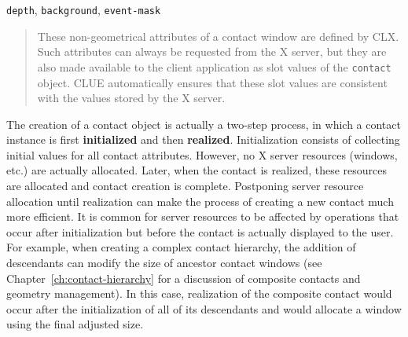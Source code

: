 \begin{flushright} \parbox[t]{6.125in}{
{\tt depth}, {\tt background}, {\tt event-mask}
\begin{quote}
These non-geometrical attributes of a contact window are defined by CLX. Such
attributes can always be requested from the X server, but they are also made
available to the client application as slot values of the {\tt contact}
object. CLUE automatically ensures that these slot values are consistent with
the values stored by the X server.
\end{quote}

}\end{flushright}



The creation of a contact object is actually a two-step process, in which a
contact instance is first {\bf initialized} and 
then {\bf realized}. Initialization consists
of collecting initial values for all contact attributes. However, no X server
 resources (windows, etc.) are actually
allocated.  Later, when the contact is realized,
these resources are allocated and contact creation is complete. Postponing
server resource allocation until realization can make the process of creating a
new contact much more efficient. It is common for server resources to be
affected by operations that occur after initialization but before the contact is
actually displayed to the user. For example, when creating a complex contact
hierarchy, the addition of descendants can modify the size of ancestor contact
windows (see Chapter~\ref{ch:contact-hierarchy} for a discussion of composite
contacts and geometry management). In this case, realization of the composite
contact would occur after the initialization of all of its descendants and would
allocate a window using the final adjusted size.

